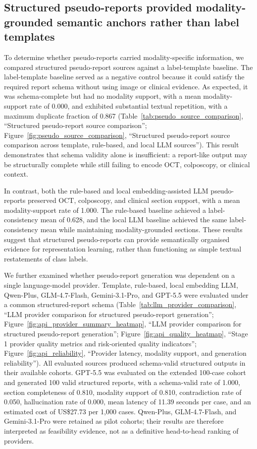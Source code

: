 \subsection{Structured pseudo-reports provided modality-grounded semantic anchors rather than label templates}
\label{subsec:pseudo_report_results}

To determine whether pseudo-reports carried modality-specific information, we compared structured pseudo-report sources against a label-template baseline. The label-template baseline served as a negative control because it could satisfy the required report schema without using image or clinical evidence. As expected, it was schema-complete but had no modality support, with a mean modality-support rate of 0.000, and exhibited substantial textual repetition, with a maximum duplicate fraction of 0.867 (Table~\ref{tab:pseudo_source_comparison}, ``Structured pseudo-report source comparison''; Figure~\ref{fig:pseudo_source_comparison}, ``Structured pseudo-report source comparison across template, rule-based, and local LLM sources''). This result demonstrates that schema validity alone is insufficient: a report-like output may be structurally complete while still failing to encode OCT, colposcopy, or clinical context.

In contrast, both the rule-based and local embedding-assisted LLM pseudo-reports preserved OCT, colposcopy, and clinical section support, with a mean modality-support rate of 1.000. The rule-based baseline achieved a label-consistency mean of 0.628, and the local LLM baseline achieved the same label-consistency mean while maintaining modality-grounded sections. These results suggest that structured pseudo-reports can provide semantically organised evidence for representation learning, rather than functioning as simple textual restatements of class labels.

We further examined whether pseudo-report generation was dependent on a single language-model provider. Template, rule-based, local embedding LLM, Qwen-Plus, GLM-4.7-Flash, Gemini-3.1-Pro, and GPT-5.5 were evaluated under a common structured-report schema (Table~\ref{tab:llm_provider_comparison}, ``LLM provider comparison for structured pseudo-report generation''; Figure~\ref{fig:api_provider_summary_heatmap}, ``LLM provider comparison for structured pseudo-report generation''; Figure~\ref{fig:api_quality_heatmap}, ``Stage 1 provider quality metrics and risk-oriented quality indicators''; Figure~\ref{fig:api_reliability}, ``Provider latency, modality support, and generation reliability''). All evaluated sources produced schema-valid structured outputs in their available cohorts. GPT-5.5 was evaluated on the extended 100-case cohort and generated 100 valid structured reports, with a schema-valid rate of 1.000, section completeness of 0.810, modality support of 0.810, contradiction rate of 0.050, hallucination rate of 0.000, mean latency of 11.39 seconds per case, and an estimated cost of US\$27.73 per 1,000 cases. Qwen-Plus, GLM-4.7-Flash, and Gemini-3.1-Pro were retained as pilot cohorts; their results are therefore interpreted as feasibility evidence, not as a definitive head-to-head ranking of providers.

